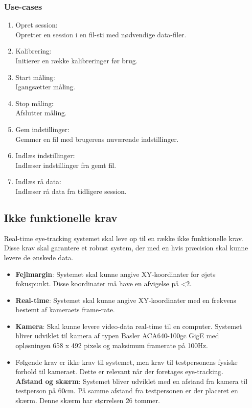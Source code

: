 \documentclass[rapport.tex]{subfiles}
\begin{document}
	\subsubsection{Use-cases}	
	\label{usec}
	\begin{enumerate}
		\item Opret session: \\Opretter en session i en fil-sti med nødvendige data-filer. 
		\item Kalibrering: \\Initierer en række kalibreringer før brug. 
		\item Start måling: \\Igangsætter måling.
		\item Stop måling: \\Afslutter måling.
		\item Gem indstillinger: \\Gemmer en fil med brugerens nuværende indstillinger.
		\item Indlæs indstillinger: \\Indlæser indstillinger fra gemt fil.
		\item Indlæs rå data: \\Indlæser rå data fra tidligere session. 
	\end{enumerate}
	\subsection{Ikke funktionelle krav}
	Real-time eye-tracking systemet skal leve op til en række ikke funktionelle krav. Disse krav skal garantere et robust system, der med en hvis præcision skal kunne levere de ønskede data.\\
	\begin{itemize}
		\item 
		\textbf{Fejlmargin}: Systemet skal kunne angive XY-koordinater for øjets fokuspunkt. Disse koordinater må have en afvigelse på <2\degree \cite{FairchildInSiboska}.
		\item 
		\textbf{Real-time}: Systemet skal kunne angive XY-koordinater med en frekvens bestemt af kameraets frame-rate. 
		\item
		\textbf{Kamera}: Skal kunne levere video-data real-time til en computer. Systemet bliver udviklet til kamera af typen Basler
		ACA640-100gc GigE med opløsningen 658 x 492 pixels og maksimum framerate på 100Hz.
		\item Følgende krav er ikke krav til systemet, men krav til testpersonens fysiske forhold til kameraet. Dette er relevant når der foretages eye-tracking. \\
		\textbf{Afstand og skærm}: Systemet bliver udviklet med en afstand fra kamera til testperson på 60cm. 
		På samme afstand fra testpersonen er der placeret en skærm. Denne skærm har størrelsen 26 tommer.
	\end{itemize}
	
\end{document}
